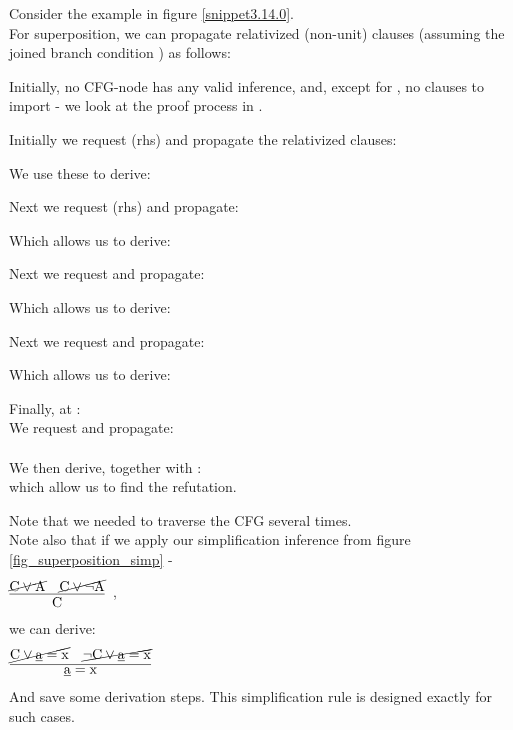 \noindent
Consider the example in figure \ref{snippet3.14.0}.\\
For superposition, we can propagate relativized (non-unit) clauses (assuming the joined branch condition ) as follows:

\bigskip
\noindent
Initially, no CFG-node has any valid inference, and, except for , no clauses to import - we look at the proof process in .

\bigskip
\noindent
Initially we request (rhs)  and propagate the relativized clauses:\\

\bigskip
\noindent
We use these to derive:\\

\bigskip
\noindent
Next we request (rhs)  and propagate:\\

\bigskip
\noindent
Which allows us to derive:\\

\bigskip
\noindent
Next we request  and propagate:\\

\bigskip
\noindent
Which allows us to derive:\\

\bigskip
\noindent
Next we request  and propagate:\\

\bigskip
\noindent
Which allows us to derive:\\

\bigskip
\noindent
Finally, at :\\
We request  and propagate:\\
\\
We then derive, together with :\\
 which allow us to find the refutation.

\bigskip
\noindent
Note that we needed to traverse the CFG several times.\\
Note also that if we apply our simplification inference  from figure \ref{fig_superposition_simp} - \\
$\vcenter{\infer[]{\m{C}                      }{\cancel{\m{C \lor A }} & \cancel{\m{C \lor \lnot A}}}} \parbox[c][1.2cm]{3cm}{}$,\\
we can derive:\\
$\vcenter{\infer[]{\m{\underline{a}=x}                      }{\cancel{\m{C \lor \underline{a} = x}} & \cancel{\m{\lnot C \lor \underline{a} = x}}}} \parbox[c][1.2cm]{3cm}{}$\\
And save some derivation steps. This simplification rule is designed exactly for such cases.

